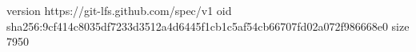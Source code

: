 version https://git-lfs.github.com/spec/v1
oid sha256:9cf414c8035df7233d3512a4d6445f1cb1c5af54cb66707fd02a072f986668e0
size 7950

